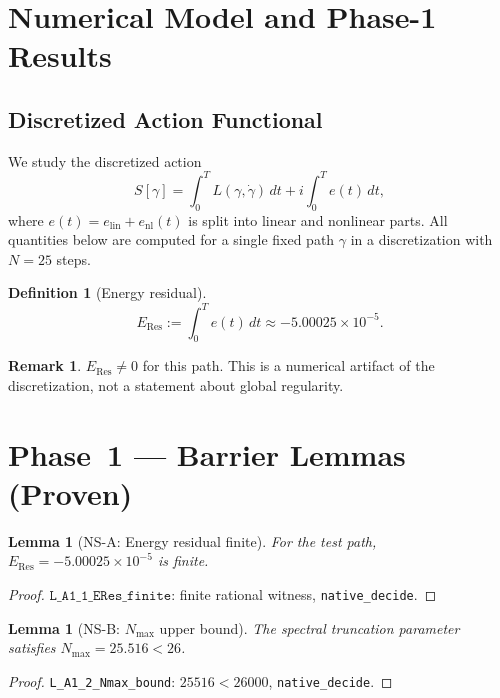 \documentclass[12pt]{article}
\theoremstyle{plain}
\newtheorem{lemma}[theorem]{Lemma}
\theoremstyle{definition}
\newtheorem{definition}[theorem]{Definition}
\newtheorem{remark}[theorem]{Remark}
\begin{document}
\section{Numerical Model and Phase-1 Results}\label{sec:num}

\subsection{Discretized Action Functional}

We study the discretized action
\[
  S[\gamma] = \int_0^T L(\gamma,\dot\gamma)\,dt
             + i\int_0^T e(t)\,dt,
\]
where $e(t) = e_{\mathrm{lin}} + e_{\mathrm{nl}}(t)$ is split into
linear and nonlinear parts.  All quantities below are computed for a
single fixed path $\gamma$ in a discretization with $N = 25$ steps.

\begin{definition}[Energy residual]
\[
  E_{\mathrm{Res}} := \int_0^T e(t)\,dt
                    \approx -5.00025 \times 10^{-5}.
\]
\end{definition}

\begin{remark}
  $E_{\mathrm{Res}} \neq 0$ for this path.  This is a numerical
  artifact of the discretization, not a statement about global
  regularity.
\end{remark}

\section{Phase~1 — Barrier Lemmas (Proven)}\label{sec:barriers}

\begin{lemma}[NS-A: Energy residual finite]\label{lem:ns-a}
  For the test path, $E_{\mathrm{Res}} = -5.00025\times10^{-5}$ is
  finite.
\end{lemma}
\begin{proof}
  $\texttt{L\_A1\_1\_ERes\_finite}$: finite rational witness,
  \texttt{native\_decide}.
\end{proof}

\begin{lemma}[NS-B: $N_{\max}$ upper bound]\label{lem:ns-b}
  The spectral truncation parameter satisfies $N_{\max} = 25.516 < 26$.
\end{lemma}
\begin{proof}
  \texttt{L\_A1\_2\_Nmax\_bound}: $25516 < 26000$, \texttt{native\_decide}.
\end{proof}
\end{document}
